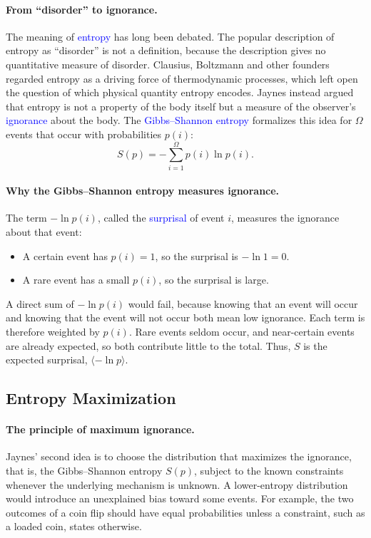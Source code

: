 \paragraph{From ``disorder'' to ignorance.}
The meaning of \textcolor{blue}{entropy} has long been debated. The popular
description of entropy as ``disorder'' is not a definition, because the description gives
no quantitative measure of disorder. Clausius, Boltzmann and other founders
regarded entropy as a driving force of thermodynamic processes, which left
open the question of which physical quantity entropy encodes. Jaynes instead
argued that entropy is not a property of the body itself but a measure of
the observer's \textcolor{blue}{ignorance} about the body. The
\textcolor{blue}{Gibbs--Shannon entropy} formalizes this idea for $\Omega$
events that occur with probabilities $p(i)$:
\begin{equation}
    \boxed{S(p) = -\sum_{i=1}^{\Omega} p(i)\ln p(i).}
\end{equation}

\paragraph{Why the Gibbs--Shannon entropy measures ignorance.}
The term $-\ln p(i)$, called the \textcolor{blue}{surprisal} of event $i$,
measures the ignorance about that event:
\begin{itemize}
    \item A certain event has $p(i)=1$, so the surprisal is $-\ln 1 = 0$.
    \item A rare event has a small $p(i)$, so the surprisal is large.
\end{itemize}
A direct sum of $-\ln p(i)$ would fail, because knowing that an event will
occur and knowing that the event will not occur both mean low ignorance. Each term
is therefore weighted by $p(i)$. Rare events seldom occur, and near-certain
events are already expected, so both contribute little to the total. Thus,
$S$ is the expected surprisal, $\langle -\ln p\rangle$.

\subsection{Entropy Maximization}

\paragraph{The principle of maximum ignorance.}
Jaynes' second idea is to choose the distribution that maximizes the
ignorance, that is, the Gibbs--Shannon entropy $S(p)$, subject to the known
constraints whenever the underlying mechanism is unknown. A lower-entropy
distribution would introduce an unexplained bias toward some events. For
example, the two outcomes of a coin flip should have equal probabilities
unless a constraint, such as a loaded coin, states otherwise.

